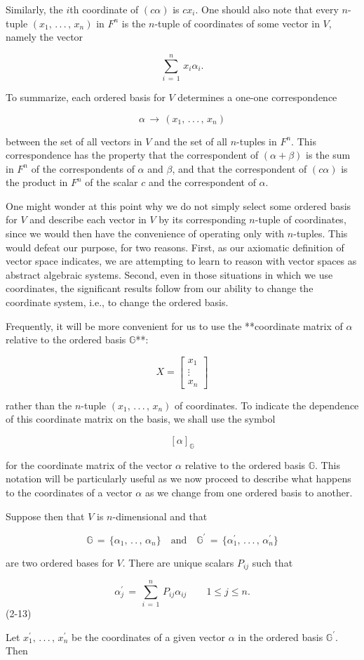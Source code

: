 Similarly, the \(i\)th coordinate of \((c\alpha)\) is \(cx_{i}\). One should also note that every \(n\)-tuple \((x_{1},\,.\,.\,.\,,\,x_{n})\) in \(F^{n}\) is the \(n\)-tuple of coordinates of some vector in \(V\), namely the vector

\[\sum\limits_{i\,=\,1}^{n}\,x_{i}\alpha_{i}.\]

To summarize, each ordered basis for \(V\) determines a one-one correspondence

\[\alpha\,\rightarrow\,(x_{1},\,.\,.\,.\,,\,x_{n})\]

between the set of all vectors in \(V\) and the set of all \(n\)-tuples in \(F^{n}\). This correspondence has the property that the correspondent of \((\alpha+\beta)\) is the sum in \(F^{n}\) of the correspondents of \(\alpha\) and \(\beta\), and that the correspondent of \((c\alpha)\) is the product in \(F^{n}\) of the scalar \(c\) and the correspondent of \(\alpha\).

One might wonder at this point why we do not simply select some ordered basis for \(V\) and describe each vector in \(V\) by its corresponding \(n\)-tuple of coordinates, since we would then have the convenience of operating only with \(n\)-tuples. This would defeat our purpose, for two reasons. First, as our axiomatic definition of vector space indicates, we are attempting to learn to reason with vector spaces as abstract algebraic systems. Second, even in those situations in which we use coordinates, the significant results follow from our ability to change the coordinate system, i.e., to change the ordered basis.

Frequently, it will be more convenient for us to use the **coordinate matrix of \(\alpha\) relative to the ordered basis \(\mathbb{G}\)**:

\[X=\begin{bmatrix}x_{1}\\ \vdots\\ x_{n}\end{bmatrix}\]

rather than the \(n\)-tuple \((x_{1},\,.\,.\,.\,,\,x_{n})\) of coordinates. To indicate the dependence of this coordinate matrix on the basis, we shall use the symbol

\[[\alpha]_{\mathbb{G}}\]

for the coordinate matrix of the vector \(\alpha\) relative to the ordered basis \(\mathbb{G}\). This notation will be particularly useful as we now proceed to describe what happens to the coordinates of a vector \(\alpha\) as we change from one ordered basis to another.

Suppose then that \(V\) is \(n\)-dimensional and that

\[\mathbb{G}\,=\,\{\alpha_{1},\,.\,.\,,\,\alpha_{n}\}\quad\text{and}\quad \mathbb{G}^{\prime}\,=\,\{\alpha_{1}^{\prime},\,.\,.\,.\,,\,\alpha_{n}^{ \prime}\}\]

are two ordered bases for \(V\). There are unique scalars \(P_{ij}\) such that

\[\alpha_{j}^{\prime}\,=\,\sum\limits_{i\,=\,1}^{n}\,P_{ij}\alpha_{ij}\qquad 1 \leq j\leq n.\] (2-13)

Let \(x_{1}^{\prime},\,.\,.\,.\,,\,x_{n}^{\prime}\) be the coordinates of a given vector \(\alpha\) in the ordered basis \(\mathbb{G}^{\prime}\). Then 